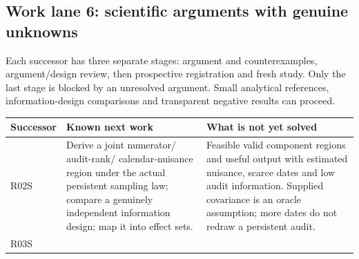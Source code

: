 \documentclass[
  10pt,
]{article}
\begin{document}
\hypertarget{work-lane-6-scientific-arguments-with-genuine-unknowns}{%
\subsection{Work lane 6: scientific arguments with genuine
unknowns}\label{work-lane-6-scientific-arguments-with-genuine-unknowns}}

Each successor has three separate stages: argument and counterexamples,
argument/design review, then prospective registration and fresh study.
Only the last stage is blocked by an unresolved argument. Small
analytical references, information-design comparisons and transparent
negative results can proceed.

\begin{longtable}[]{@{}>{\raggedright\arraybackslash}p{}>{\raggedright\arraybackslash}p{}>{\raggedright\arraybackslash}p{}@{}}
\toprule
\begin{minipage}[b]{\linewidth}\raggedright
Successor\strut
\end{minipage} & \begin{minipage}[b]{\linewidth}\raggedright
Known next work\strut
\end{minipage} & \begin{minipage}[b]{\linewidth}\raggedright
What is not yet solved\strut
\end{minipage}\tabularnewline
\midrule
\endhead
\begin{minipage}[t]{\linewidth}\raggedright
R02S\strut
\end{minipage} & \begin{minipage}[t]{\linewidth}\raggedright
Derive a joint numerator/ audit-rank/ calendar-nuisance region under the
actual persistent sampling law; compare a genuinely independent
information design; map it into effect sets.\strut
\end{minipage} & \begin{minipage}[t]{\linewidth}\raggedright
Feasible valid component regions and useful output with estimated
nuisance, scarce dates and low audit information. Supplied covariance is
an oracle assumption; more dates do not redraw a persistent audit.\strut
\end{minipage}\tabularnewline
\begin{minipage}[t]{\linewidth}\raggedright
R03S\strut
\end{minipage} & \begin{minipage}[t]{\linewidth}\raggedright

\end{minipage}
\end{longtable}
\end{document}
